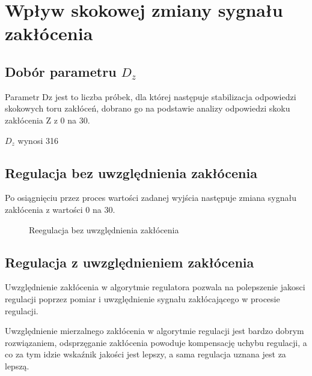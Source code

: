 \section{Wpływ skokowej zmiany sygnału zakłócenia}
\label{lab:zad5}

\subsection{Dobór parametru $D_z$}
\label{lab:zad4:Dz}

Parametr Dz jest to liczba próbek, dla której następuje stabilizacja odpowiedzi
skokowych toru zakłóceń, 
dobrano go na podstawie analizy odpowiedzi skoku zakłócenia Z z \num{0} na \num{30}.

$D_{z}$ wynosi \num{316}

\subsection{Regulacja bez uwzględnienia zakłócenia}
\label{lab:zad4:regulacjaBezUwzgZ}

Po osiągnięciu przez proces wartości zadanej wyjścia następuje zmiana sygnału
zakłócenia z wartości \num{0} na \num{30}.

\begin{figure}[H] 
    \centering
    
    \caption{Reegulacja bez uwzględnienia zakłócenia}
    \label{lab:zad5:regulacjaBezUwzgZ:figure}
\end{figure}

\subsection{Regulacja z uwzględnieniem zakłócenia}
\label{lab:zad4:regulacjaUwzgZ}

Uwzględnienie zakłócenia w algorytmie regulatora pozwala na polepszenie jakosci regulacji \newline
poprzez pomiar i uwzględnienie sygnału zakłócającego w procesie regulacji.

Uwzględnienie mierzalnego zakłócenia w algorytmie regulacji jest bardzo
dobrym rozwiązaniem, 
odsprzęganie zakłócenia powoduje kompensację uchybu regulacji, 
a co za tym idzie wskaźnik jakości jest lepszy, 
a sama regulacja uznana jest za lepszą.

\newpage
